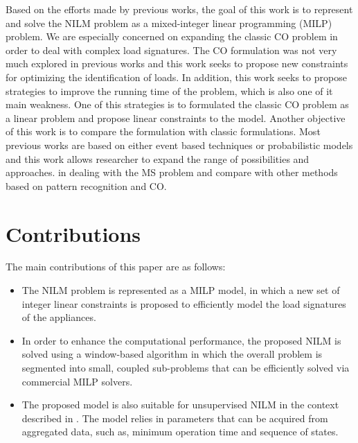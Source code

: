 Based on the efforts made by previous works, the goal of this work is to represent and solve the NILM problem as a mixed-integer linear programming (MILP) problem. We are especially concerned on expanding the classic CO problem in order to deal with complex load signatures. The CO formulation was not very much explored in previous works and this work seeks to propose new constraints for optimizing the identification of loads. In addition, this work seeks to propose strategies to improve the running time of the problem, which is also one of it main weakness. One of this strategies is to formulated the classic CO problem as a linear problem and propose linear constraints to the model. Another objective of this work is to compare the formulation with classic formulations. Most previous works are based on either event based techniques or probabilistic models and this work allows researcher to expand the range of possibilities and approaches.  in  dealing with the MS problem and compare with other methods based on pattern recognition and CO.


\section{Contributions}

The main contributions of this paper are as follows:

\begin{itemize}
\item The NILM problem is represented as a MILP model, in which a new set of integer linear constraints is proposed to efficiently model the load signatures of the appliances.
\item In order to enhance the computational performance, the proposed NILM is solved using a window-based algorithm in which the overall problem is segmented into small, coupled sub-problems that can be efficiently solved via commercial MILP solvers.
\item The proposed model is also suitable for unsupervised NILM in the context described in \cite{makonin2016}. The model relies in parameters that can be acquired from aggregated data, such as, minimum operation time and sequence of states.
\end{itemize}

